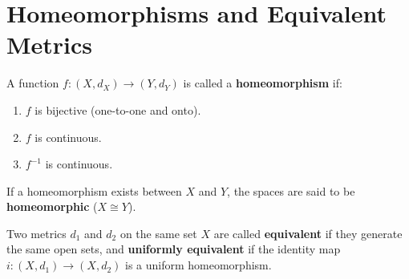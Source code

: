 \section{Homeomorphisms and Equivalent Metrics}
\label{sec:homeomorphism}

\begin{definition}[Homeomorphism]
A function $f: (X, d_X) \to (Y, d_Y)$ is called a \textbf{homeomorphism} if:
\begin{enumerate}[label=\rm{(\roman*)}]
    \item $f$ is bijective (one-to-one and onto).
    \item $f$ is continuous.
    \item $f^{-1}$ is continuous.
\end{enumerate}
If a homeomorphism exists between $X$ and $Y$, the spaces are said to be \textbf{homeomorphic} ($X \cong Y$).
\end{definition}

\begin{definition}
Two metrics $d_1$ and $d_2$ on the same set $X$ are called \textbf{equivalent} if they generate the same open sets, and \textbf{uniformly equivalent} if the identity map $i: (X, d_1) \to (X, d_2)$ is a uniform homeomorphism.
\end{definition}
